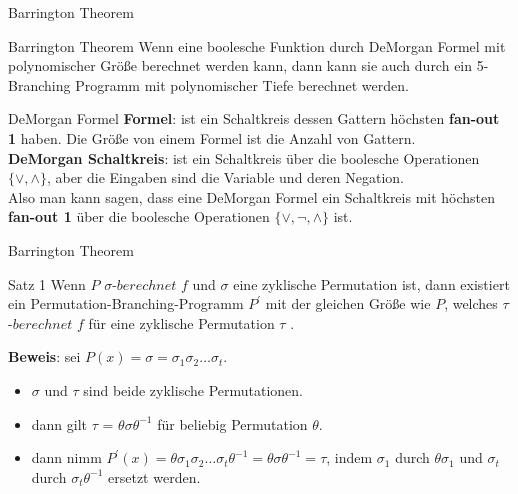 \documentclass{beamer}
\begin{document}
\begin{frame}{Barrington Theorem}
\begin{block}{Barrington Theorem}
Wenn eine boolesche Funktion durch DeMorgan Formel mit polynomischer Größe berechnet werden kann, dann kann sie auch durch ein 5-Branching Programm mit  polynomischer Tiefe berechnet werden.
\begin{block}{DeMorgan Formel}
\textbf{Formel}: ist ein Schaltkreis dessen Gattern höchsten \textbf{fan-out 1} haben. Die Größe von einem Formel ist die Anzahl von Gattern. \\[4pt]
\textbf{DeMorgan Schaltkreis}: ist ein Schaltkreis über die boolesche Operationen $\{\vee, \wedge\}$, aber die Eingaben sind die Variable und deren Negation.\\[4pt]
Also man kann sagen, dass eine DeMorgan Formel ein Schaltkreis mit höchsten \textbf{fan-out 1} über die boolesche Operationen $\{\vee,\lnot, \wedge\}$ ist.
\end{block} 
\end{block}
\end{frame}


\begin{frame}{Barrington Theorem}
\begin{block}{Satz 1}
Wenn $P$ $\sigma$-$berechnet$ $f$ und $\sigma$ eine zyklische Permutation ist, dann existiert ein Permutation-Branching-Programm $P^{'}$ mit der gleichen Größe wie $P$, welches $\tau$-$berechnet$ $f$ für eine zyklische Permutation $\tau$ .
\end{block}
\textbf{Beweis}: sei $P(x) = \sigma = \sigma_1\sigma_2\dots\sigma_t$. \\[4pt]
\begin{itemize}
\item  $\sigma$ und $\tau$ sind beide zyklische Permutationen.\\[4pt]
\item dann gilt $\tau$ = $\theta\sigma\theta^{-1}$ für beliebig Permutation $\theta$.\\[4pt]
\item dann nimm $P^{'}(x) = \theta\sigma_1\sigma_2\dots\sigma_t\theta^{-1} = \theta\sigma\theta^{-1} = \tau$, indem $\sigma_1$ durch $\theta\sigma_1$ und $\sigma_t$ durch $\sigma_t\theta^{-1}$ ersetzt werden.
\end{itemize}

\end{frame}
\end{document}
